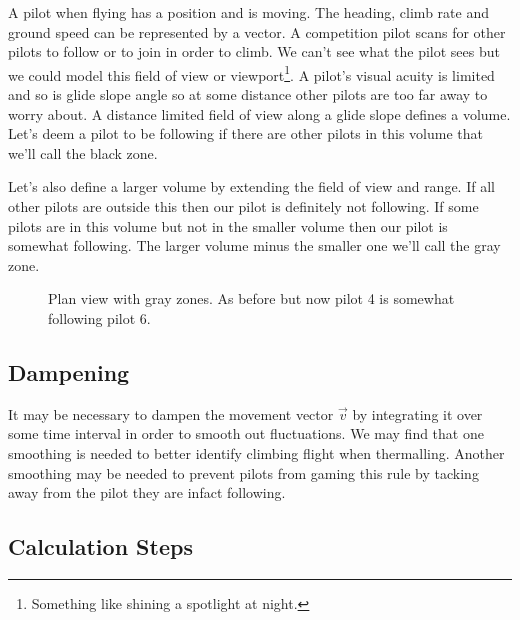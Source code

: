 \documentclass[gap.tex]{subfiles}
\begin{document}
A pilot when flying has a position and is moving. The heading, climb rate and
ground speed can be represented by a vector. A competition pilot scans for
other pilots to follow or to join in order to climb. We can't see what the
pilot sees but we could model this field of view or viewport\footnote{Something
like shining a spotlight at night.}. A pilot's visual acuity is limited and so
is glide slope angle so at some distance other pilots are too far away to worry
about. A distance limited field of view along a glide slope defines a volume.
Let's deem a pilot to be following if there are other pilots in this volume
that we'll call the black zone.

Let's also define a larger volume by extending the field of view and range. If
all other pilots are outside this then our pilot is definitely not following.
If some pilots are in this volume but not in the smaller volume then our pilot
is somewhat following. The larger volume minus the smaller one we'll call the
gray zone.

\begin{figure}[ht]
    \centering
    
    \caption{Plan view with gray zones. As before but now pilot 4 is somewhat following pilot 6.}
    \label{fig:view-port-zones}
\end{figure}

\subsection{Dampening}
It may be necessary to dampen the movement vector \(\vec{v}\) by integrating it
over some time interval in order to smooth out fluctuations. We may find that
one smoothing is needed to better identify climbing flight when thermalling.
Another smoothing may be needed to prevent pilots from gaming this rule by
tacking away from the pilot they are infact following.

\subsection{Calculation Steps}
\end{document}
